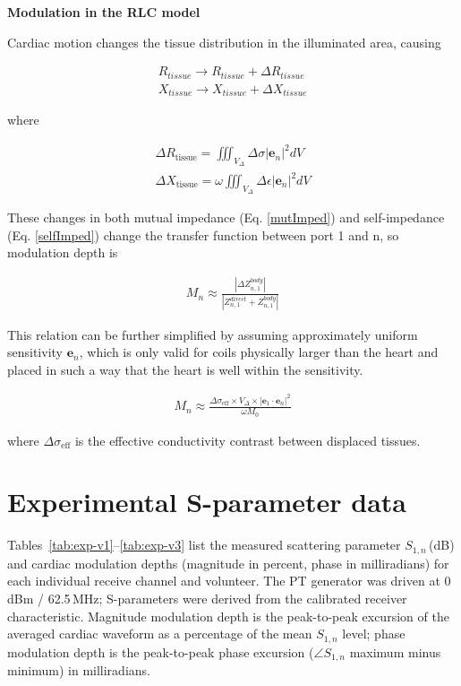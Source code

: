 \textbf{Modulation in the RLC model}

Cardiac motion changes the tissue distribution in the illuminated area, causing

\begin{align}
    R_{tissue} \rightarrow R_{tissue} + \Delta R_{tissue} \\
    X_{tissue} \rightarrow X_{tissue} + \Delta X_{tissue}
\end{align}

where

\begin{align}
    \Delta R_{\mathrm{tissue}} = \iiint_{V_{\Delta}} \Delta \sigma |\mathbf{e}_n|^2 dV \\
    \Delta X_{\mathrm{tissue}} = \omega \iiint_{V_{\Delta}} \Delta \epsilon |\mathbf{e}_n|^2 dV
\end{align}

These changes in both mutual impedance (Eq. \eqref{mutImped}) and self-impedance (Eq. \eqref{selfImped}) change the transfer function between port 1 and n, so modulation depth is

\begin{align}
    M_n \approx \frac{|\Delta Z_{n,1}^{body}|}{|Z_{n,1}^{direct} + Z_{n,1}^{body}|}
\end{align}

This relation can be further simplified by assuming approximately uniform sensitivity $\mathbf{e}_n$, which is only valid for coils physically larger than the heart and placed in such a way that the heart is well within the sensitivity.

\begin{align}
    M_n \approx \frac{\Delta \sigma_{\mathrm{eff}} \times V_{\Delta} \times |\mathbf{e}_1 \cdot \mathbf{e}_n|^2}{\omega M_0}
\end{align}

where $\Delta \sigma_{\mathrm{eff}}$ is the effective conductivity contrast between displaced tissues.


\section{Experimental S-parameter data}\label{app:exp-data}

Tables~\ref{tab:exp-v1}--\ref{tab:exp-v3} list the measured scattering parameter $S_{1,n}$\,(dB) and cardiac modulation depths (magnitude in percent, phase in milliradians) for each individual receive channel and volunteer. The PT generator was driven at 0\,dBm / 62.5\,MHz; S-parameters were derived from the calibrated receiver characteristic. Magnitude modulation depth is the peak-to-peak excursion of the averaged cardiac waveform as a percentage of the mean $S_{1,n}$ level; phase modulation depth is the peak-to-peak phase excursion ($\angle S_{1,n}$ maximum minus minimum) in milliradians.

